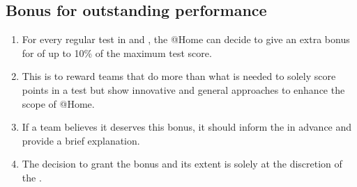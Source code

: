 \subsection{Bonus for outstanding performance}\label{rule:outstanding_performance}
\begin{enumerate}
	\item For every regular test in  and , the @Home \TC{} can decide to give an extra bonus for  of up to 10\% of the maximum test score.

	\item This is to reward teams that do more than what is needed to solely score points in a test but show innovative and general approaches to enhance the scope of @Home.

	\item If a team believes it deserves this bonus, it should inform the \TC{} in advance and provide a brief explanation.

	\item The decision to grant the bonus and its extent is solely at the discretion of the \TC{}.
\end{enumerate}
